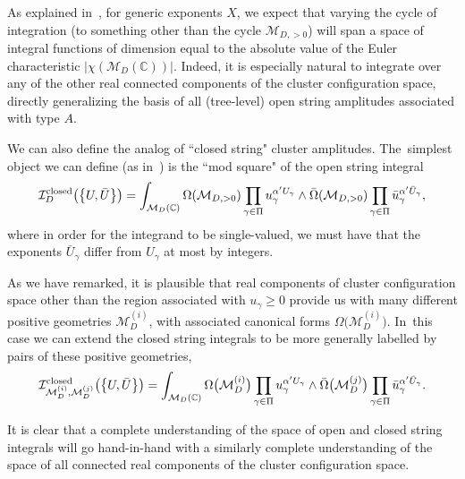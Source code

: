 \documentclass[10pt,a4paper]{amsart}
\def\C{{\mathbb C}}
\def\I{{\mathcal{I}}}
\def\M{{\mathcal{M}}}
\numberwithin{equation}{section}
\begin{document}
As explained in~\cite[Section~7]{AHL}, for generic exponents $X$, we expect that varying the cycle of integration (to something other than the cycle $\M_{D,>0}$) will span a space of integral functions of dimension equal to the absolute value of the Euler characteristic $|\chi(\M_D(\C))|$. Indeed, it is especially natural to integrate over any of the other real connected components of the cluster configuration space, directly generalizing the basis of all (tree-level) open string amplitudes associated with type $A$.

We can also define the analog of ``closed string" cluster amplitudes. The~simplest object we can define (as in~\cite{AHL}) is the ``mod square" of the open string integral
\begin{gather*}
\I_{D}^{\rm{closed}}\big(\big\{U,\bar{U}\big\}\big)=
\int_{\M_D(\C)} \Omega(\M_{D,>0}) \prod_{\gamma \in \Pi} u_\gamma^{\alpha' U_\gamma} \wedge
 \bar{\Omega}(\M_{D,>0}) \prod_{\gamma \in \Pi} \bar{u}_\gamma^{\alpha' \bar{U}_\gamma},
\end{gather*}
where in order for the integrand to be single-valued, we must have that the exponents $\bar{U}_\gamma$ differ from $U_\gamma$ at most by integers.

As we have remarked, it is plausible that real components of cluster configuration space other than the region associated with $u_\gamma \geq 0$ provide us with many different positive geometries $\M^{(i)}_{D}$, with associated canonical forms
$ \Omega\big(\M^{(i)}_{D}\big) $. In~this case we can extend the closed string integrals to be more generally labelled by pairs of these positive geometries,
\begin{gather*}
\I_{\M^{(i)}_{D},\M^{(j)}_{D}}^{\rm{closed}}\big(\big\{U,\bar{U}\big\}\big)=
\int_{\M_D(\C)} \Omega\big(\M^{(i)}_{D}\big) \prod_{\gamma \in \Pi} u_\gamma^{\alpha' U_\gamma} \wedge
 \bar{\Omega}\big(\M^{(j)}_{D}\big) \prod_{\gamma \in \Pi} \bar{u}_\gamma^{\alpha' \bar{U}_\gamma}.
\end{gather*}

It is clear that a complete understanding of the space of open and closed string integrals will go hand-in-hand with a similarly complete understanding of the space of all connected real components of the cluster configuration space.
\end{document}
